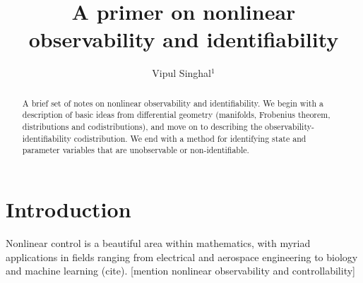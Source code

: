 \documentclass[psamsfonts]{amsart}
\title{A primer on nonlinear observability and identifiability} %
\author{Vipul Singhal$^{1}$}
\theoremstyle{definition}
\theoremstyle{remark}
\numberwithin{equation}{section}
\begin{document}
\begin{abstract}

A brief set of notes on nonlinear observability and identifiability. We begin with a description of basic ideas from differential geometry (manifolds, Frobenius theorem, distributions and codistributions), and move on to describing the observability-identifiability codistribution. We end with a method for identifying state and parameter variables that are unobservable or non-identifiable. %


\end{abstract}

\maketitle
\tableofcontents

\section{Introduction} 
Nonlinear control is a beautiful area within mathematics, with myriad applications in fields ranging from electrical and aerospace engineering to biology and machine learning (cite). [mention nonlinear observability and controllability]
\end{document}
